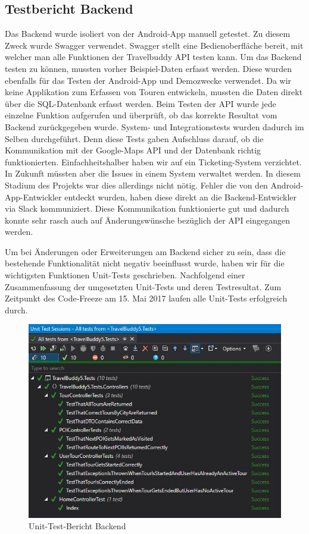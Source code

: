 \subsection{Testbericht Backend}\label{backendTestbericht}
Das Backend wurde isoliert von der Android-App manuell getestet. Zu diesem Zweck wurde Swagger verwendet. Swagger stellt eine Bedienoberfläche bereit, mit welcher man alle Funktionen der Travelbuddy API testen kann. Um das Backend testen zu können, mussten vorher Beispiel-Daten erfasst werden. Diese wurden ebenfalls für das Testen der Android-App und Demozwecke verwendet. Da wir keine Applikation zum Erfassen von Touren entwickeln, mussten die Daten direkt über die SQL-Datenbank erfasst werden. Beim Testen der API wurde jede einzelne Funktion aufgerufen und überprüft, ob das korrekte Resultat vom Backend zurückgegeben wurde. System- und Integrationstests wurden dadurch im Selben durchgeführt. Denn diese Tests gaben Aufschluss darauf, ob die Kommunikation mit der Google-Maps API und der Datenbank richtig funktionierten. Einfachheitshalber haben wir auf ein Ticketing-System verzichtet. In Zukunft müssten aber die Issues in einem System verwaltet werden. In diesem Stadium des Projekts war dies allerdings nicht nötig. Fehler die von den Android-App-Entwickler entdeckt wurden, haben diese direkt an die Backend-Entwickler via Slack kommuniziert. Diese Kommunikation funktionierte gut und dadurch konnte sehr rasch auch auf Änderungswünsche bezüglich der API eingegangen werden.

Um bei Änderungen oder Erweiterungen am Backend sicher zu sein, dass die bestehende Funktionalität nicht negativ beeinflusst wurde, haben wir für die wichtigsten Funktionen Unit-Tests geschrieben. Nachfolgend einer Zusammenfassung der umgesetzten Unit-Tests und deren Testresultat. Zum Zeitpunkt des Code-Freeze am 15. Mai 2017 laufen alle Unit-Tests erfolgreich durch.

\begin{figure}
  \includegraphics{backend_unit_test_summary}
  \caption{Unit-Test-Bericht Backend }
\end{figure}

